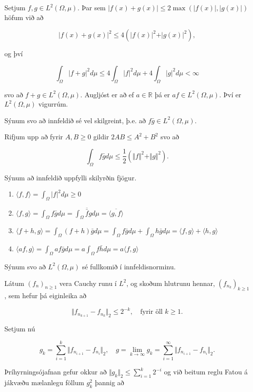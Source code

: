 \documentclass[]{book}
\providecommand{\tightlist}{%
  \setlength{\itemsep}{0pt}\setlength{\parskip}{0pt}}
\begin{document}
Setjum \(f,g\in L^2(\Omega,\mu)\). Þar sem \(\vert f(x) + g(x) \vert \leq 2\max(\vert f(x)\vert, \vert g(x)\vert)\) höfum við að

\[
\vert f(x) + g(x)\vert^2\leq4(\vert f(x)\vert^2 + \vert g(x)\vert^2),
\]

og því

\[
\int_\Omega \vert f + g\vert^2d\mu \leq 4\int_\Omega\vert f\vert^2d\mu + 4\int_\Omega\vert g\vert^2d\mu < \infty
\]

svo að \(f + g\in L^2(\Omega, \mu)\). Augljóst er að ef \(a\in \mathbb R\) þá er \(af\in L^2(\Omega,\mu)\). Því er \(L^2(\Omega,\mu)\) vigurrúm.

Sýnum svo að innfeldið sé vel skilgreint, þ.e. að \(f\bar g\in L^2(\Omega, \mu)\).

Rifjum upp að fyrir \(A,B\geq0\) gildir \(2AB\leq A^2 + B^2\) svo að

\[
\int_\Omega f\bar gd\mu \leq \frac12 (\Vert f\Vert^2 + \Vert g\Vert^2).
\]

Sýnum að innfeldið uppfylli skilyrðin fjögur.

\begin{enumerate}
\def\labelenumi{\arabic{enumi}.}
\tightlist
\item
  \(\langle f, f\rangle = \int_\Omega |f|^2d\mu \geq 0\)
\item
  \(\langle f, g\rangle = \int_\Omega f\bar gd\mu = \overline{\int_\Omega \bar fgd\mu} = \overline{\langle g, f\rangle}\)
\item
  \(\langle f + h, g \rangle = \int_\Omega(f + h)\bar gd\mu = \int_\Omega f\bar gd\mu + \int_\Omega h\bar gd\mu = \langle f, g\rangle + \langle h, g\rangle\)
\item
  \(\langle af, g\rangle = \int_\Omega af\bar gd\mu = a\int_\Omega f\bar hd\mu = a\langle f,g\rangle\)
\end{enumerate}

Sýnum svo að \(L^2(\Omega,\mu)\) sé fullkomið í innfeldisnorminu.

Látum \((f_n)_{n\geq1}\) vera Cauchy runu í \(L^2\), og skoðum hlutrunu hennar, \((f_{n_k})_{k\geq1}\), sem hefur þá eiginleika að

\[
\Vert f_{n_{k+1}} - f_{n_k}\Vert_2 \leq 2^{-k}, \quad \text{fyrir öll }k\geq 1.
\]

Setjum nú

\[
g_k = \sum_{i=1}^k \Vert f_{n_{i+1}} - f_{n_i}\Vert_2, \quad g= \lim_{k\rightarrow\infty}g_k = \sum_{i=1}^\infty\Vert f_{n_{i+1}} - f_{n_i}\Vert_2.
\]

Þríhyrningsójafnan gefur okkur að \(\Vert g_k\Vert_2 \leq \sum_{i=1}^k2^{-i}\) og við beitum reglu Fatou á jákvæðu mælanlegu föllum \(g_k^2\) þannig að
\end{document}
